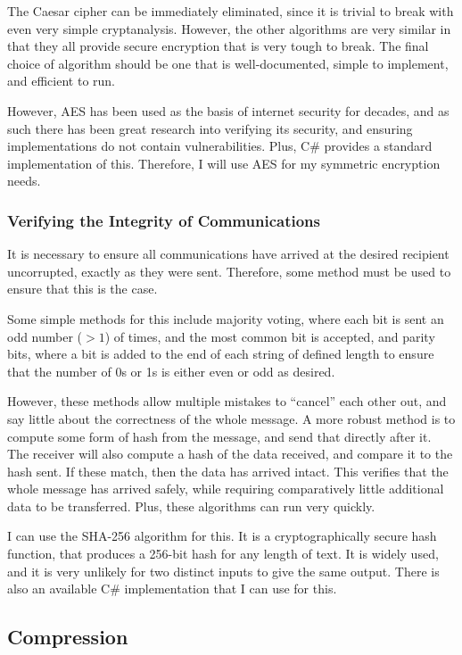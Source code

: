 \documentclass[../main.tex]{subfiles}
\begin{document}
The Caesar cipher can be immediately eliminated, since it is trivial to break with even very simple cryptanalysis. However, the other algorithms are very similar in that they all provide secure encryption that is very tough to break. The final choice of algorithm should be one that is well-documented, simple to implement, and efficient to run.

However, AES has been used as the basis of internet security for decades, and as such there has been great research into verifying its security, and ensuring implementations do not contain vulnerabilities. Plus, C\# provides a standard implementation of this. Therefore, I will use AES for my symmetric encryption needs.

\subsubsection{Verifying the Integrity of Communications} \label{VerifyingIntegritySSS}

It is necessary to ensure all communications have arrived at the desired recipient uncorrupted, exactly as they were sent. Therefore, some method must be used to ensure that this is the case. 

Some simple methods for this include majority voting, where each bit is sent an odd number ($> 1$) of times, and the most common bit is accepted, and parity bits, where a bit is added to the end of each string of defined length to ensure that the number of 0s or 1s is either even or odd as desired. 

However, these methods allow multiple mistakes to “cancel” each other out, and say little about the correctness of the whole message. A more robust method is to compute some form of hash from the message, and send that directly after it. The receiver will also compute a hash of the data received, and compare it to the hash sent. If these match, then the data has arrived intact. This verifies that the whole message has arrived safely, while requiring comparatively little additional data to be transferred. Plus, these algorithms can run very quickly.

I can use the SHA-256 algorithm for this. It is a cryptographically secure hash function, that produces a 256-bit hash for any length of text. It is widely used, and it is very unlikely for two distinct inputs to give the same output. There is also an available C\# implementation that I can use for this.

\subsection{Compression} \label{CompressionAnalysis}
\end{document}
